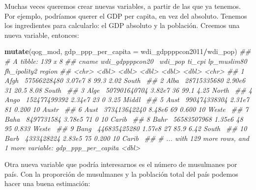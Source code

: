 \documentclass[]{book}
\newenvironment{Shaded}{\begin{snugshade}}{\end{snugshade}}
\newcommand{\CommentTok}[1]{\textcolor[rgb]{0.56,0.35,0.01}{\textit{#1}}}
\newcommand{\DataTypeTok}[1]{\textcolor[rgb]{0.13,0.29,0.53}{#1}}
\newcommand{\KeywordTok}[1]{\textcolor[rgb]{0.13,0.29,0.53}{\textbf{#1}}}
\newcommand{\NormalTok}[1]{#1}
\newcommand{\OperatorTok}[1]{\textcolor[rgb]{0.81,0.36,0.00}{\textbf{#1}}}
\begin{document}
Muchas veces queremos crear nuevas variables, a partir de las que ya
tenemos. Por ejemplo, podríamos querer el GDP per capita, en vez del
absoluto. Tenemos los ingredientes para calcularlo: el GDP absoluto y la
población. Creemos una nueva variable, entonces:

\begin{Shaded}
\begin{Highlighting}[]
\KeywordTok{mutate}\NormalTok{(qog_mod, }\DataTypeTok{gdp_ppp_per_capita =}\NormalTok{ wdi_gdppppcon2011}\OperatorTok{/}\NormalTok{wdi_pop)}
\CommentTok{## # A tibble: 139 x 8}
\CommentTok{##    cname wdi_gdppppcon20~ wdi_pop ti_cpi lp_muslim80 fh_ipolity2 region}
\CommentTok{##    <chr>            <dbl>   <dbl>  <dbl>       <dbl>       <dbl> <chr> }
\CommentTok{##  1 Afgh~      57566228480  3.07e7      8      99.3         2.02  South~}
\CommentTok{##  2 Alba~      28715335680  2.90e6     31      20.5         8.08  South~}
\CommentTok{##  3 Alge~     507901640704  3.82e7     36      99.1         4.25  North~}
\CommentTok{##  4 Ango~     152477499392  2.34e7     23       0           3.25  Middl~}
\CommentTok{##  5 Aust~     990474338304  2.31e7     81       0.200      10     Austr~}
\CommentTok{##  6 Aust~     373413642240  8.48e6     69       0.600      10     Weste~}
\CommentTok{##  7 Baha~       8497731584  3.78e5     71       0          10     Carib~}
\CommentTok{##  8 Bahr~      56583507968  1.35e6     48      95           0.833 Weste~}
\CommentTok{##  9 Bang~     446835425280  1.57e8     27      85.9         6.42  South~}
\CommentTok{## 10 Barb~       4333428224  2.83e5     75       0.200      10     Carib~}
\CommentTok{## # ... with 129 more rows, and 1 more variable: gdp_ppp_per_capita <dbl>}
\end{Highlighting}
\end{Shaded}

Otra nueva variable que podría interesarnos es el número de musulmanes
por país. Con la proporción de musulmanes y la población total del país
podemos hacer una buena estimación:
\end{document}
